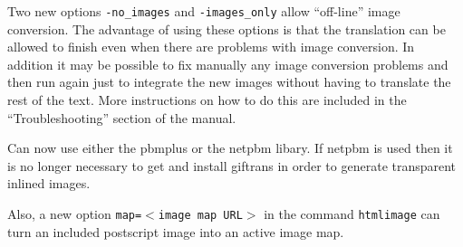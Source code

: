\begin{description}
Two new options {\tt -no\_images} and {\tt  -images\_only} allow
``off-line'' image conversion. The advantage of using these options is 
that the translation can be allowed to finish even when there are
problems with image conversion. In addition it may be possible to 
fix manually any image conversion problems and then run \latextohtml 
again just to integrate the new images without having to translate
the rest of the text. More instructions on how to do this are
included in the ``Troubleshooting'' section of the \latextohtml
manual.

Can now use either the {\fn pbmplus} or the {\fn netpbm} libary.
If {\fn netpbm} is used then it is no longer necessary to get and
install {\fn giftrans} in order to generate transparent inlined 
images.

Also, a new option {\tt map=$<$image map URL$>$} in the 
command {\tt htmlimage} can turn an included postscript image into an active
image map.


\end{description}
